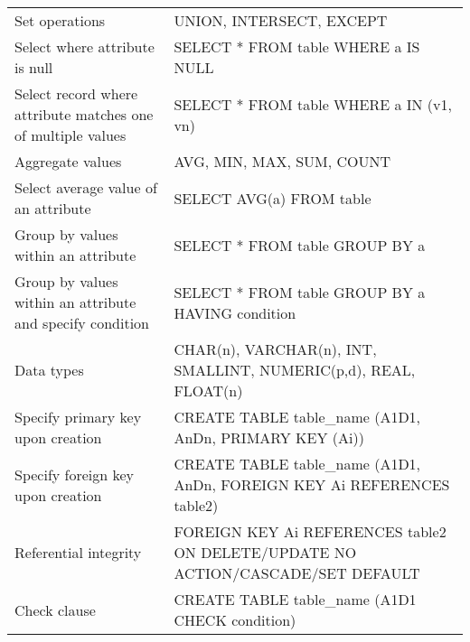 \documentclass[a4paper,8pt,twocolumn]{extarticle}
\begin{document}
\begin{table}[h]
{\begin{tabular}{p{0.35\linewidth} | p{0.65\linewidth}}
Set operations                                                 & UNION, INTERSECT, EXCEPT                                                                 \\
Select where attribute is null                                 & SELECT * FROM table WHERE a IS NULL                                                      \\
Select record where attribute matches one of multiple values   & SELECT * FROM table WHERE a IN (v1, vn)                                                  \\
Aggregate values                                               & AVG, MIN, MAX, SUM, COUNT                                                                \\
Select average value of an attribute                           & SELECT AVG(a) FROM table                                                                 \\
Group by values within an attribute                            & SELECT * FROM table GROUP BY a                                                           \\
Group by values within an attribute and specify condition      & SELECT * FROM table GROUP BY a HAVING condition                                          \\
Data types                                                     & CHAR(n), VARCHAR(n), INT, SMALLINT, NUMERIC(p,d), REAL, FLOAT(n)                         \\
Specify primary key upon creation                              & CREATE TABLE table\_name (A1D1, AnDn, PRIMARY KEY (Ai))                                  \\
Specify foreign key upon creation                              & CREATE TABLE table\_name (A1D1, AnDn, FOREIGN KEY Ai REFERENCES table2)                  \\
Referential integrity                                          & FOREIGN KEY Ai REFERENCES table2 ON DELETE/UPDATE NO ACTION/CASCADE/SET DEFAULT          \\
Check clause                                                   & CREATE TABLE table\_name (A1D1 CHECK condition)          
\end{tabular}%
}
\end{table}
\end{document}
